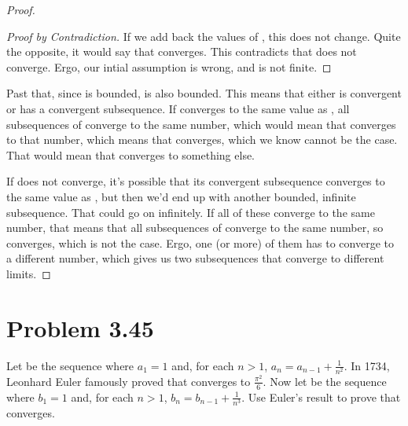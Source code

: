 \documentclass[12pt]{report}
\begin{document}
\begin{proof}
\begin{proof}[Proof by Contradiction]
                If we add back the values of , this does not change. 
                Quite the opposite, it would say that  converges. 
                This contradicts that  does not converge. 
                Ergo, our intial assumption is wrong, and  is not finite.
            \end{proof}

            Past that, since  is bounded,  is also bounded.
            This means that  either is convergent or has a convergent subsequence.
            If  converges to the same value as , all subsequences of  converge to the same number, which would mean that  converges to that number, which means that  converges, which we know cannot be the case.
            That would mean that  converges to something else.

            If  does not converge, it's possible that its convergent subsequence converges to the same value as , but then we'd end up with another bounded, infinite subsequence.
            That could go on infinitely.
            If all of these converge to the same number, that means that all subsequences of  converge to the same number, so  converges, which is not the case.
            Ergo, one (or more) of them has to converge to a different number, which gives us two subsequences that converge to different limits.
        \end{proof}
\pagebreak

\section{Problem 3.45}
    Let  be the sequence where $a_1 = 1$ and, for each $n > 1$, $a_n = a_{n-1} + \frac{1}{n^2}$.
    In 1734, Leonhard Euler famously proved that  converges to $\frac{\pi^2}{6}$. Now let  be the sequence where $b_1 = 1$ and, for each $n > 1$, $b_n = b_{n-1} + \frac{1}{n^3}$.
    Use Euler's result to prove that  converges.
\end{document}
